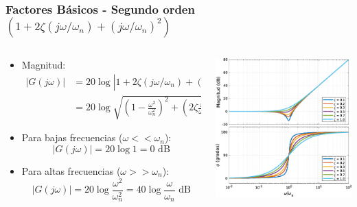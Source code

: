 \documentclass[aspectratio=169, handout]{beamer}
\theoremstyle{definition}
\theoremstyle{plain}
\theoremstyle{remark}
\begin{document}
\begin{frame}[<+->]\frametitle{Factores Básicos - Segundo orden $(1+2\zeta(j\omega/\omega_n)+(j\omega/\omega_n)^2)$}
\begin{columns}
	\begin{column}{0.5\textwidth}
	\begin{itemize}
		\item Magnitud:
		\begin{align*}
			\left| G(j\omega) \right| &= 20 \log \left| 1+2\zeta(j\omega/\omega_n)+(j\omega/\omega_n)^2 \right|\\
			&= 20 \log \sqrt{\left(1-\frac{\omega^2}{\omega_n^2}\right)^2+\left(2\zeta\frac{\omega}{\omega_n}\right)^2}
		\end{align*}
		\item Para bajas frecuencias ($\omega << \omega_n$):
		\begin{equation*}
			\left| G(j\omega) \right| = 20 \log 1 = 0 \text{ dB}
		\end{equation*}
		\item Para altas frecuencias ($\omega >> \omega_n$):
		\begin{equation*}
			\left| G(j\omega) \right| = 20 \log \frac{\omega^2}{\omega_n^2} = 40 \log \frac{\omega}{\omega_n} \text{ dB}
		\end{equation*}
	\end{itemize}
	\end{column}
	\begin{column}{0.5\textwidth}
	\centering
	\includegraphics[width=6.5cm]{images/bodeSecondOrderDerivative.eps}
	\end{column}
\end{columns}
\end{frame}
\end{document}
